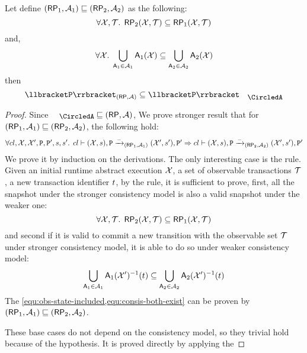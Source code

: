 \begin{proposition}
\label{prop:aexec-semantics-mono}
Let define \( (\RP_1, \Ax_1) \sqsubseteq (\RP_2, \Ax_2) \) as the following:
\[
    \fora{\aexec,\T} \RP_2(\aexec,\T) \subseteq \RP_1(\aexec,\T)
\]
and,
\[
    \forall \mathcal{X} \ldotp \; \bigcup_{\mathsf{A}_1 \in \mathcal{A}_1}\mathsf{A}_1(\mathcal{X}) \subseteq \bigcup_{\mathsf{A}_2 \in \mathcal{A}_2}\mathsf{A}_2(\mathcal{X})
\]
then
\[ \interpr{\prog}_{(\RP, \Ax)} \subseteq \interpr{\prog}_{\anarchic} \]
\end{proposition}
\begin{proof}
    Since \( \anarchic \sqsubseteq (\RP, \Ax) \),
    We prove stronger result that for \( (\RP_1, \Ax_1) \sqsubseteq  (\RP_2, \Ax_2)\),
    the following  hold:
    \[
        \begin{array}{@{}l@{}}
            \fora{\cl, \aexec, \aexec', \prog, \prog', \stk, \stk'} 
            \cl \vdash ( \aexec, \stk ), \prog \toAEXEC{\stub}_{(\RP_1, \Ax_1)} ( \aexec', \stk' ), \prog' 
            \implies \cl \vdash ( \aexec, \stk ), \prog \toAEXEC{\stub}_{(\RP_2, \Ax_2)} ( \aexec', \stk' ), \prog' \\
        \end{array}
    \]
    We prove it by induction on the derivations.
    The only interesting case is the  rule.
    Given an initial runtime abstract execution \( \mathcal{X} \),
    a set of observable transactions \( \mathcal{T} \),
    a new transaction identifier \( t \),
    by the  rule, it is sufficient to prove, 
    first, all the snapshot under the stronger consistency model is also a valid snapshot under the weaker one:
    \begin{equation}
        \label{equ:obs-state-included}
        \fora{\aexec,\T} \RP_2(\aexec,\T) \subseteq  \RP_1(\aexec,\T)
    \end{equation}
    and second if it is valid  to commit a new transition with the observable set \( \mathcal{T} \) under stronger consistency model,
    it is able to do so under weaker consistency model:
    \begin{equation}
        \label{equ:consis-both-exist}
        \bigcup_{\mathsf{A}_1 \in \mathcal{A}_1}\mathsf{A}_1(\mathcal{X}')^{-1}(t) \subseteq \bigcup_{\mathsf{A}_2 \in \mathcal{A}_2}\mathsf{A}_2(\mathcal{X}')^{-1}(t)
    \end{equation}
    The \cref{equ:obs-state-included,equ:consis-both-exist} can be proven by \( (\RP_1, \Ax_1) \sqsubseteq  (\RP_2, \Ax_2) \).

    These base cases do not depend on the consistency model, so they trivial hold because of the hypothesis.
    It is proved directly by applying the \ih
\end{proof}
